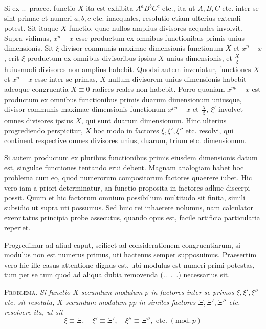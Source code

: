 Si ex \textsection.\textsection.\ praecc. functio $X$ ita est exhibita $A^aB^bC^c$ etc., ita ut $A,B,C$ etc. inter se sint primae et numeri $a,b,c$ etc. inaequales, resolutio etiam ulterius extendi potest. Sit itaque $X$ functio, quae nullos amplius divisores aequales involvit. Supra vidimus, $x^p-x$ esse productum ex omnibus functionibus primis unius dimensionis. Sit $\xi$ divisor communis maximae dimensionis functionum $X$ et $x^p-x$, erit $\xi$ productum ex omnibus divisoribus ipsius $X$ unius dimensionis, et $\frac X\xi$ huiusmodi divisores non amplius habebit. Quodsi autem inveniatur, functiones $X$ et $x^p-x$ esse inter se primas, $X$ nullum divisorem unius dimensionis habebit adeoque congruentia $X\equiv0$ radices reales non habebit. Porro quoniam $x^{pp}-x$ est productum ex omnibus functionibus primis duarum dimensionum uniusque, divisor communis maximae dimensionis functionum $x^{pp}-x$ et $\frac X\xi$, $\xi'$ involvet omnes divisores ipsius $X$, qui sunt duarum dimensionum. Hinc ulterius progrediendo perspicitur, $X$ hoc modo in factores $\xi,\xi',\xi''$ etc. resolvi, qui continent respective omnes divisores unius, duarum, trium etc. dimensionum.

Si autem productum ex pluribus functionibus primis eiusdem dimensionis datum est, singulae functiones tentando erui debent. Magnam analogiam habet hoc problema cum eo, quod numerorum compositorum factores quaerere iubet. Hic vero iam a priori determinatur, an functio proposita in factores adhuc discerpi possit. Quum et hic factorum omnium possibilium multitudo sit finita, simili subsidio ut supra uti possumus. Sed huic rei inhaerere nolumus, nam calculator exercitatus principia probe assecutus, quando opus est, facile artificia particularia reperiet.

Progredimur ad aliud caput, scilicet ad considerationem congruentiarum, si modulus non est numerus primus, uti hactenus semper supposuimus. Praesertim vero hic ille casus attentione dignus est, ubi modulus est numeri primi potestas, tum per se tum quod ad aliqua dubia removenda (\textsection.\textsection.\ .\ .) necessarius sit.

%
\textsc{Problema.} \emph{Si functio $X$ secundum modulum $p$ in factores inter se primos $\xi,\xi',\xi''$ etc. sit resoluta, $X$ secundum modulum $pp$ in similes factores $\Xi,\Xi',\Xi''$ etc. resolvere ita, ut sit}
\[
\xi\equiv\Xi,\quad\xi'\equiv\Xi',\quad\xi''\equiv\Xi'',\text{ etc.}\;(\mathrm{mod.}\,p)
\]

